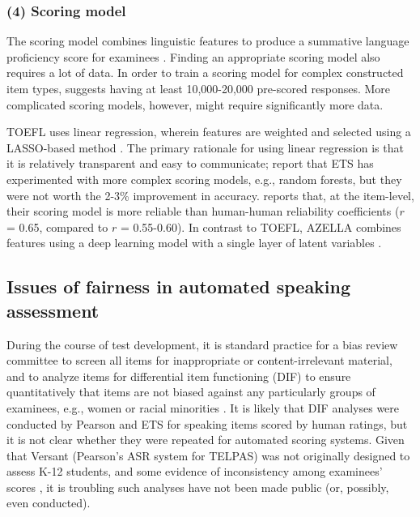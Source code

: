 \documentclass [PhD] {uclathes}
\begin{document}
\subsubsection{(4) Scoring model}

The scoring model combines linguistic features to produce a summative language proficiency score for examinees \citep{loukina2019scoring}. Finding an appropriate scoring model also requires a lot of data. In order to train a scoring model for complex constructed item types, \citet{zechner2019summary} suggests having at least 10,000-20,000 pre-scored responses. More complicated scoring models, however, might require significantly more data.

TOEFL uses linear regression, wherein features are weighted and selected using a LASSO-based method \citep{loukina2015feature}. The primary rationale for using linear regression is that it is relatively transparent and easy to communicate; \citet{loukina2019scoring} report that ETS has experimented with more complex scoring models, e.g., random forests, but they were not worth the 2-3\% improvement in accuracy. \citet{zechner2019summary} reports that, at the item-level, their scoring model is more reliable than human-human reliability coefficients ($r$ = 0.65, compared to $r$ = 0.55-0.60). In contrast to TOEFL, AZELLA combines features using a deep learning model with a single layer of latent variables \citep{cheng2014automatic}.

\subsection{Issues of fairness in automated speaking assessment}

During the course of test development, it is standard practice for a bias review committee to screen all items for inappropriate or content-irrelevant material, and to analyze items for differential item functioning (DIF) to ensure quantitatively that items are not biased against any particularly groups of examinees, e.g., women or racial minorities \citep{aera2014}. It is likely that DIF analyses were conducted by Pearson and ETS for speaking items scored by human ratings, but it is not clear whether they were repeated for automated scoring systems. Given that Versant (Pearson’s ASR system for TELPAS) was not originally designed to assess K-12 students, and some evidence of inconsistency among examinees’ scores \citep{collier2020test}, it is troubling such analyses have not been made public (or, possibly, even conducted).
\end{document}
